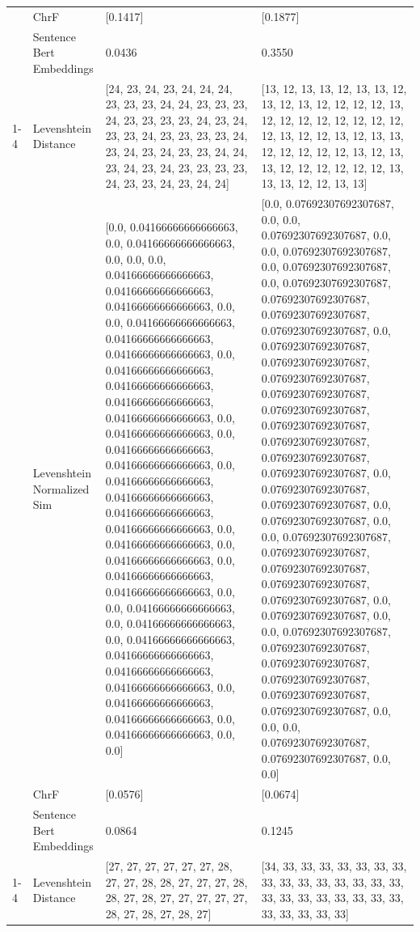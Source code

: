 \begin{tabular}{llll}
 & ChrF & [0.1417] & [0.1877] \\
 & Sentence Bert Embeddings & 0.0436 & 0.3550 \\
\cline{1-4}
\multirow[t]{4}{*}{Mundu mugo nderaguragira} & Levenshtein Distance & [24, 23, 24, 23, 24, 24, 24, 23, 23, 23, 24, 24, 23, 23, 23, 24, 23, 23, 23, 23, 24, 23, 24, 23, 23, 24, 23, 23, 23, 23, 24, 23, 24, 23, 24, 23, 23, 24, 24, 23, 24, 23, 24, 23, 23, 23, 23, 24, 23, 23, 24, 23, 24, 24] & [13, 12, 13, 13, 12, 13, 13, 12, 13, 12, 13, 12, 12, 12, 12, 13, 12, 12, 12, 12, 12, 12, 12, 12, 12, 13, 12, 12, 13, 12, 13, 13, 12, 12, 12, 12, 12, 13, 12, 13, 13, 12, 12, 12, 12, 12, 12, 13, 13, 13, 12, 12, 13, 13] \\
 & Levenshtein Normalized Sim & [0.0, 0.04166666666666663, 0.0, 0.04166666666666663, 0.0, 0.0, 0.0, 0.04166666666666663, 0.04166666666666663, 0.04166666666666663, 0.0, 0.0, 0.04166666666666663, 0.04166666666666663, 0.04166666666666663, 0.0, 0.04166666666666663, 0.04166666666666663, 0.04166666666666663, 0.04166666666666663, 0.0, 0.04166666666666663, 0.0, 0.04166666666666663, 0.04166666666666663, 0.0, 0.04166666666666663, 0.04166666666666663, 0.04166666666666663, 0.04166666666666663, 0.0, 0.04166666666666663, 0.0, 0.04166666666666663, 0.0, 0.04166666666666663, 0.04166666666666663, 0.0, 0.0, 0.04166666666666663, 0.0, 0.04166666666666663, 0.0, 0.04166666666666663, 0.04166666666666663, 0.04166666666666663, 0.04166666666666663, 0.0, 0.04166666666666663, 0.04166666666666663, 0.0, 0.04166666666666663, 0.0, 0.0] & [0.0, 0.07692307692307687, 0.0, 0.0, 0.07692307692307687, 0.0, 0.0, 0.07692307692307687, 0.0, 0.07692307692307687, 0.0, 0.07692307692307687, 0.07692307692307687, 0.07692307692307687, 0.07692307692307687, 0.0, 0.07692307692307687, 0.07692307692307687, 0.07692307692307687, 0.07692307692307687, 0.07692307692307687, 0.07692307692307687, 0.07692307692307687, 0.07692307692307687, 0.07692307692307687, 0.0, 0.07692307692307687, 0.07692307692307687, 0.0, 0.07692307692307687, 0.0, 0.0, 0.07692307692307687, 0.07692307692307687, 0.07692307692307687, 0.07692307692307687, 0.07692307692307687, 0.0, 0.07692307692307687, 0.0, 0.0, 0.07692307692307687, 0.07692307692307687, 0.07692307692307687, 0.07692307692307687, 0.07692307692307687, 0.07692307692307687, 0.0, 0.0, 0.0, 0.07692307692307687, 0.07692307692307687, 0.0, 0.0] \\
 & ChrF & [0.0576] & [0.0674] \\
 & Sentence Bert Embeddings & 0.0864 & 0.1245 \\
\cline{1-4}
\multirow[t]{4}{*}{Guthii kuonagia mundu njira.} & Levenshtein Distance & [27, 27, 27, 27, 27, 27, 28, 27, 27, 28, 28, 27, 27, 27, 28, 28, 27, 28, 27, 27, 27, 27, 27, 28, 27, 28, 27, 28, 27] & [34, 33, 33, 33, 33, 33, 33, 33, 33, 33, 33, 33, 33, 33, 33, 33, 33, 33, 33, 33, 33, 33, 33, 33, 33, 33, 33, 33, 33] \\

\end{tabular}
